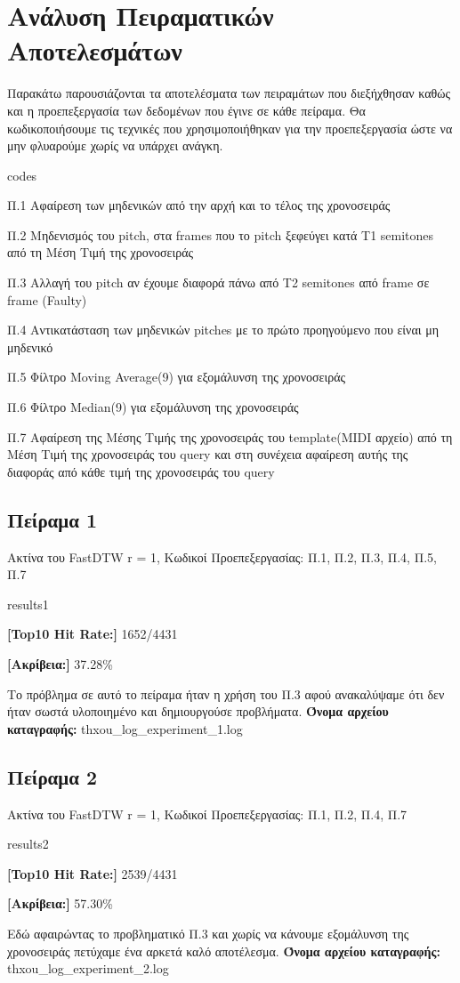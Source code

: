 \section{Ανάλυση Πειραματικών Αποτελεσμάτων}
Παρακάτω παρουσιάζονται τα αποτελέσματα των πειραμάτων που διεξήχθησαν καθώς και η προεπεξεργασία
των δεδομένων που έγινε σε κάθε πείραμα.
Θα κωδικοποιήσουμε τις τεχνικές που χρησιμοποιήθηκαν για την προεπεξεργασία ώστε να μην φλυαρούμε χωρίς
να υπάρχει ανάγκη.
\begin{labeling}{codes}
  \item[Π.1] Αφαίρεση των μηδενικών από την αρχή και το τέλος της χρονοσειράς
  \item[Π.2] Μηδενισμός του pitch, στα frames που το pitch ξεφεύγει κατά T1 semitones από τη Μέση Τιμή της χρονοσειράς
  \item[Π.3] Αλλαγή του pitch αν έχουμε διαφορά πάνω από Τ2 semitones από frame σε frame (Faulty)
  \item[Π.4] Αντικατάσταση των μηδενικών pitches με το πρώτο προηγούμενο που είναι μη μηδενικό
  \item[Π.5] Φίλτρο Moving Average(9) για εξομάλυνση της χρονοσειράς
  \item[Π.6] Φίλτρο Median(9) για εξομάλυνση της χρονοσειράς
  \item[Π.7] Αφαίρεση της Μέσης Τιμής της χρονοσειράς του template(MIDI αρχείο) από τη Μέση Τιμή της χρονοσειράς του query και στη συνέχεια αφαίρεση αυτής της διαφοράς από κάθε τιμή της χρονοσειράς του query 
\end{labeling}

\subsection{Πείραμα 1}
Ακτίνα του FastDTW r = 1, Κωδικοί Προεπεξεργασίας: Π.1, Π.2, Π.3, Π.4, Π.5, Π.7
\begin{labeling}{results1}
  \item \textbf{[Top10 Hit Rate:]} 1652/4431
  \item \textbf{[Ακρίβεια:]} 37.28\%
\end{labeling}
Το πρόβλημα σε αυτό το πείραμα ήταν η χρήση του Π.3 αφού ανακαλύψαμε ότι δεν ήταν σωστά υλοποιημένο και δημιουργούσε προβλήματα.
\textbf{Όνομα αρχείου καταγραφής:} thxou\_log\_experiment\_1.log

\subsection{Πείραμα 2}
Ακτίνα του FastDTW r = 1, Κωδικοί Προεπεξεργασίας: Π.1, Π.2, Π.4, Π.7
\begin{labeling}{results2}
  \item \textbf{[Top10 Hit Rate:]} 2539/4431
  \item \textbf{[Ακρίβεια:]} 57.30\%
\end{labeling}
Εδώ αφαιρώντας το προβληματικό Π.3 και χωρίς να κάνουμε εξομάλυνση της χρονοσειράς πετύχαμε ένα αρκετά καλό αποτέλεσμα.
\textbf{Όνομα αρχείου καταγραφής:} thxou\_log\_experiment\_2.log

